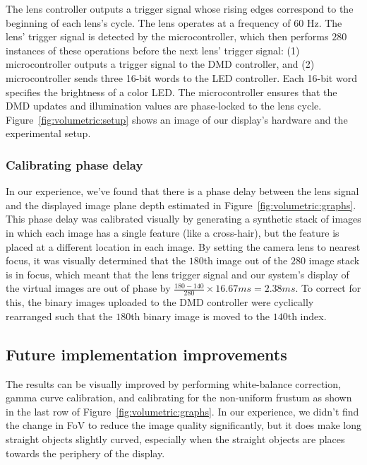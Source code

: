 The lens controller outputs a trigger signal whose rising edges correspond to the beginning of each lens's cycle. The lens operates at a frequency of 60 Hz. The lens' trigger signal is detected by the microcontroller, which then performs $280$ instances of these operations before the next lens' trigger signal: (1) microcontroller outputs a trigger signal to the DMD controller, and (2) microcontroller sends three 16-bit words to the LED controller. Each 16-bit word specifies the brightness of a color LED. The microcontroller ensures that the DMD updates and illumination values are phase-locked to the lens cycle. Figure~\ref{fig:volumetric:setup} shows an image of our display's hardware and the experimental setup. 

\subsubsection{Calibrating phase delay}
In our experience, we've found that there is a phase delay between the lens signal and the displayed image plane depth estimated in Figure~\ref{fig:volumetric:graphs}. This phase delay was calibrated visually by generating a synthetic stack of images in which each image has a single feature (like a cross-hair), but the feature is placed at a different location in each image. By setting the camera lens to nearest focus, it was visually determined that the $180$th image out of the $280$ image stack is in focus, which meant that the lens trigger signal and our system's display of the virtual images are out of phase by $\frac{180 - 140}{280} \times 16.67ms = 2.38 ms$. To correct for this, the binary images uploaded to the DMD controller were cyclically rearranged such that the $180$th binary image is moved to the $140$th index.

\subsection{Future implementation improvements}
The results can be visually improved by performing white-balance correction, gamma curve calibration, and calibrating for the non-uniform frustum as shown in the last row of Figure~\ref{fig:volumetric:graphs}. In our experience, we didn't find the change in FoV to reduce the image quality significantly, but it does make long straight objects slightly curved, especially when the straight objects are places towards the periphery of the display. 


